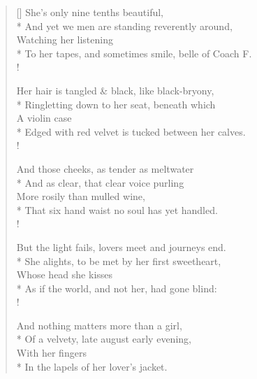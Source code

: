 \settowidth{\versewidth}{To her tapes, and sometimes smile, belle of Coach F.}
\begin{verse}[\versewidth]
She's only nine tenths beautiful,\\*
\vin And yet we men are standing reverently around,\\
\vin \vin Watching her listening\\*
To her tapes, and sometimes smile, belle of Coach F.\\!

Her hair is tangled \& black, like black-bryony,\\*
\vin Ringletting down to her seat, beneath which\\
\vin \vin A violin case\\*
Edged with red velvet is tucked between her calves.\\!

And those cheeks, as tender as meltwater\\*
\vin And as clear, that clear voice purling\\
\vin \vin More rosily than mulled wine,\\*
That six hand waist no soul has yet handled.\\!

But the light fails, lovers meet and journeys end.\\*
\vin She alights, to be met by her first sweetheart,\\
\vin \vin Whose head she kisses\\*
As if the world, and not her, had gone blind:\\!

And nothing matters more than a girl,\\*
\vin Of a velvety, late august early evening,\\
\vin \vin With her fingers\\*
In the lapels of her lover's jacket.
\end{verse}

\vspace{0.5in}

\begin{minipage}{\textwidth}
\end{minipage}
